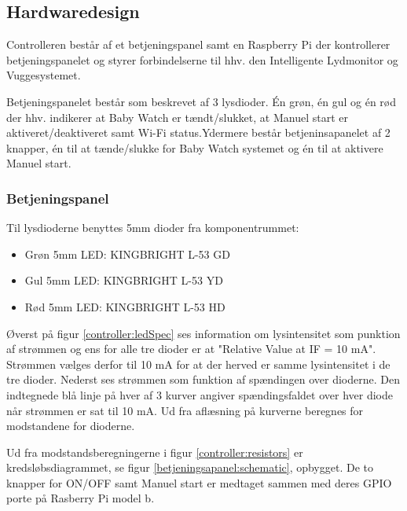 \subsection{Hardwaredesign}

Controlleren består af et betjeningspanel samt en Raspberry Pi der kontrollerer betjeningspanelet og styrer forbindelserne til hhv. den Intelligente Lydmonitor og Vuggesystemet.

Betjeningspanelet består som beskrevet af 3 lysdioder. Én grøn, én gul og én rød der hhv. indikerer at Baby Watch er tændt/slukket, at Manuel start er aktiveret/deaktiveret samt Wi-Fi status.Ydermere består betjeninsapanelet af 2 knapper, én til at tænde/slukke for Baby Watch systemet og én til at aktivere Manuel start.
 
\subsubsection*{Betjeningspanel}

Til lysdioderne benyttes 5mm dioder fra komponentrummet: 

\begin{itemize}
	\item Grøn 5mm LED: KINGBRIGHT L-53 GD
	\item Gul 5mm LED: KINGBRIGHT L-53 YD
	\item Rød 5mm LED: KINGBRIGHT L-53 HD
\end{itemize}



Øverst på figur \ref{controller:ledSpec} ses information om lysintensitet som punktion af strømmen og ens for alle tre dioder er at "Relative Value at IF = 10 mA". Strømmen vælges derfor til 10 mA for at der herved er samme lysintensitet i de tre dioder. Nederst ses strømmen som funktion af spændingen over dioderne. Den indtegnede blå linje på hver af 3 kurver angiver spændingsfaldet over hver diode når strømmen er sat til 10 mA. Ud fra aflæsning på kurverne beregnes for modstandene for dioderne.


Ud fra modstandsberegningerne i figur \ref{controller:resistors} er kredsløbsdiagrammet, se figur \ref{betjeningsapanel:schematic}, opbygget. De to knapper for ON/OFF samt Manuel start er medtaget sammen med deres GPIO porte på Rasberry Pi model b.

